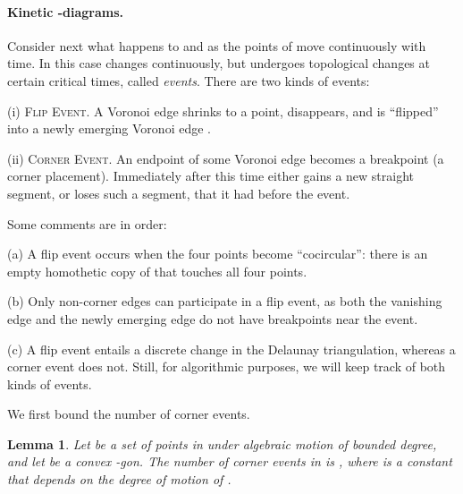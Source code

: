 \documentclass[letter,11pt]{article}
\newtheorem{lemma}[theorem]{Lemma}
\begin{document}
\paragraph{Kinetic -diagrams.}
Consider next what happens to  and 
as the points of  move continuously with time.
In this case  changes
continuously, but undergoes topological
changes at certain critical times, called \emph{events}. There are 
two kinds of events:

\smallskip
\noindent (i) \textsc{Flip Event.}
A Voronoi edge  shrinks to a point, disappears, and is
``flipped'' into a newly emerging Voronoi edge .

\smallskip
\noindent (ii) \textsc{Corner Event.}
An endpoint of some Voronoi edge  becomes a breakpoint (a
corner placement). Immediately after this time  either 
gains a new straight segment, or loses such a segment, that it had before the event.

\smallskip
Some comments are in order: 

\smallskip
\noindent(a) A flip event
occurs when the four points  become ``cocircular'':
there is an empty homothetic copy  of  that touches all four points.

\smallskip
\noindent(b) Only non-corner edges can participate in a flip event, as
both the vanishing edge  and the newly emerging edge
 do not have breakpoints near the event.

\smallskip
\noindent(c) A flip event entails a discrete change in the
Delaunay triangulation, whereas a corner event does not.
Still, for algorithmic purposes, we will keep track of both kinds of events.

\smallskip
We first bound the number of corner events.

\begin{lemma} \label{corners}
Let  be a set of  points in  under algebraic
motion of bounded degree, and let  be a convex -gon. 
The number of corner events in  is , 
where  is a constant that depends on the degree of motion
of .
\end{lemma}
\end{document}
